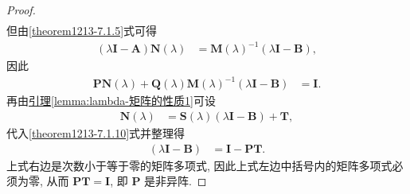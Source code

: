 \documentclass[../../main.tex]{subfiles}%
\begin{document}
\begin{proof}
\begin{align*}
\end{align*}
但由\eqref{theorem1213-7.1.5}式可得
\begin{align*}
(\lambda\boldsymbol{I}-\boldsymbol{A})\boldsymbol{N}(\lambda)&=\boldsymbol{M}(\lambda)^{-1}(\lambda\boldsymbol{I}-\boldsymbol{B}),
\end{align*}
因此
\begin{align}
\boldsymbol{P}\boldsymbol{N}(\lambda)+\boldsymbol{Q}(\lambda)\boldsymbol{M}(\lambda)^{-1}(\lambda\boldsymbol{I}-\boldsymbol{B})&=\boldsymbol{I}. \label{theorem1213-7.1.10}
\end{align}
再由\hyperref[lemma:lambda-矩阵的性质1]{引理\ref{lemma:lambda-矩阵的性质1}}可设
\begin{align*}
\boldsymbol{N}(\lambda)&=\boldsymbol{S}(\lambda)(\lambda\boldsymbol{I}-\boldsymbol{B})+\boldsymbol{T},
\end{align*}
代入\eqref{theorem1213-7.1.10}式并整理得
\begin{align*}
[\boldsymbol{P}\boldsymbol{S}(\lambda)+\boldsymbol{Q}(\lambda)\boldsymbol{M}(\lambda)^{-1}](\lambda\boldsymbol{I}-\boldsymbol{B})&=\boldsymbol{I}-\boldsymbol{P}\boldsymbol{T}.
\end{align*}
上式右边是次数小于等于零的矩阵多项式, 因此上式左边中括号内的矩阵多项式必须为零, 从而 $\boldsymbol{P}\boldsymbol{T}=\boldsymbol{I}$, 即 $\boldsymbol{P}$ 是非异阵.

\end{proof}
\end{document}
